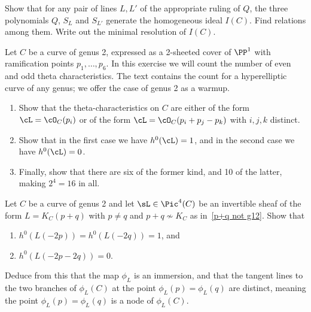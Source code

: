 \begin{exercise}\label{ideal of genus 2 degree 5} 
Show that for any pair of lines $L, L'$ of the appropriate ruling of $Q$, the three polynomials $Q$, $S_L$ and $S_{L'}$ generate the homogeneous ideal $I(C)$. Find relations among them. Write out the minimal resolution of $I(C)$.
\end{exercise}


\begin{exercise}\label{theta char on genus 2} %
 Let $C$ be a curve of genus 2, expressed as a 2-sheeted cover of $\PP^1$ with ramification points $p_1,\dots,p_6$. In this exercise we will
 count the number of
 even and odd theta characteristics.
The text contains the count for a hyperelliptic curve of any genus; we offer 
the case of genus 2 as a warmup.
 \begin{enumerate}
 \item Show that the theta-characteristics on $C$ are either of the form $\cL = \cO_C(p_i)$ or of the form $\cL = \cO_C(p_i + p_j - p_k)$ with $i, j, k$ distinct. 
 \item Show that in the first case we have $h^0(\cL) = 1$, and in the second case we have $h^0(\cL) = 0$. 
 \item Finally, show that there are six of the former kind, and 10 of the latter, making $2^4 = 16$ in all.
 \end{enumerate} 
 \end{exercise}
 
 
\begin{exercise}\label{nodal quartic}
Let $C$ be a  curve of genus 2 and let $\sL\in \Pic^4(C)$ be an invertible sheaf of the form $L = K_C(p+q)$ with $p \neq q$ and $p+q \not\sim K_C$ as in~\ref{p+q not g12}. Show that
\begin{enumerate}
\item $h^0(L(-2p)) = h^0(L(-2q)) = 1$, and
\item $h^0(L(-2p-2q)) = 0$.
\end{enumerate}
Deduce from this that the map $\phi_L$ is an immersion, and that the tangent lines to the two branches of $\phi_L(C)$ at the point $\phi_L(p) = \phi_L(q)$ are distinct, meaning the point $\phi_L(p) = \phi_L(q)$ is a node of $\phi_L(C)$.
\end{exercise}


